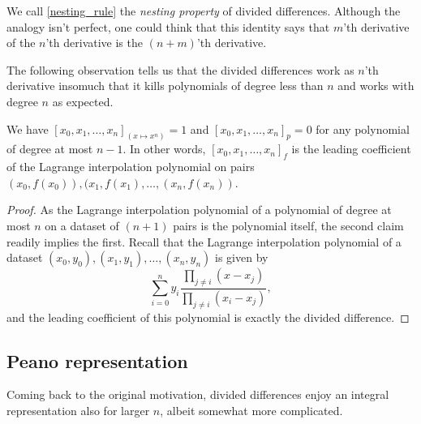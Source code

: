 We call \ref{nesting_rule} the \textit{nesting property} of divided differences. Although the analogy isn't perfect, one could think that this identity says that $m$'th derivative of the $n$'th derivative is the $(n + m)$'th derivative. 

The following observation tells us that the divided differences work as $n$'th derivative insomuch that it kills polynomials of degree less than $n$ and works with degree $n$ as expected.

\begin{prop}\label{lagrange_divided}
We have $[x_{0}, x_{1}, \ldots, x_{n}]_{(x \mapsto x^{n})} = 1$ and $[x_{0}, x_{1}, \ldots, x_{n}]_{p} = 0$ for any polynomial of degree at most $n - 1$. In other words, $[x_{0}, x_{1}, \ldots, x_{n}]_{f}$ is the leading coefficient of the Lagrange interpolation polynomial on pairs $(x_{0}, f(x_{0})), (x_{1}, f(x_{1}), \ldots, (x_{n}, f(x_{n}))$.
\end{prop}
\begin{proof}
	As the Lagrange interpolation polynomial of a polynomial of degree at most $n$ on a dataset of $(n + 1)$ pairs is the polynomial itself, the second claim readily implies the first. Recall that the Lagrange interpolation polynomial of a dataset $(x_{0}, y_{0}), (x_{1}, y_{1}), \ldots, (x_{n}, y_{n})$ is given by
	\[
		\sum_{i = 0}^{n} y_{i} \frac{\prod_{j \neq i}(x - x_{j})}{\prod_{j \neq i}(x_{i} - x_{j})},
	\]
	and the leading coefficient of this polynomial is exactly the divided difference.
\end{proof}

\subsection{Peano representation}

Coming back to the original motivation, divided differences enjoy an integral representation also for larger $n$, albeit somewhat more complicated.

